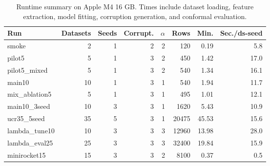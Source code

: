 \begin{table}[t]
\centering
\small
\caption{Runtime summary on Apple M4 16 GB. Times include dataset loading, feature extraction, model fitting, corruption generation, and conformal evaluation.}
\label{tab:runtime_summary}
\begin{tabular}{lrrrrrrr}
\toprule
Run & Datasets & Seeds & Corrupt. & $\alpha$ & Rows & Min. & Sec./ds-seed \\
\midrule
smoke & 2 & 1 & 2 & 2 & 120 & 0.19 & 5.8 \\
pilot5 & 5 & 1 & 3 & 2 & 450 & 1.42 & 17.0 \\
pilot5\_mixed & 5 & 1 & 3 & 2 & 540 & 1.34 & 16.1 \\
main10 & 10 & 1 & 3 & 1 & 540 & 1.94 & 11.7 \\
mix\_ablation5 & 5 & 1 & 3 & 1 & 495 & 1.01 & 12.1 \\
main10\_3seed & 10 & 3 & 3 & 1 & 1620 & 5.43 & 10.9 \\
ucr35\_5seed & 35 & 5 & 3 & 1 & 20475 & 45.53 & 15.6 \\
lambda\_tune10 & 10 & 3 & 3 & 3 & 12960 & 13.98 & 28.0 \\
lambda\_eval25 & 25 & 3 & 3 & 3 & 32400 & 19.84 & 15.9 \\
minirocket15 & 15 & 3 & 3 & 2 & 8100 & 0.37 & 0.5 \\
\bottomrule
\end{tabular}
\end{table}
